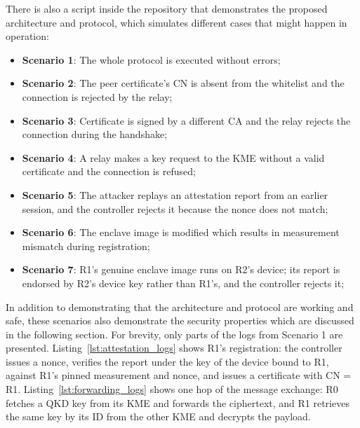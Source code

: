 \documentclass[futureinternet,article,submit,moreauthors]{Definitions/mdpi}
\begin{document}
There is also a script inside the repository that demonstrates the proposed architecture and protocol, which simulates different cases that might happen in operation:

\begin{itemize}[leftmargin=*,labelsep=5.8mm]
\item \textbf{Scenario 1}: The whole protocol is executed without errors;
\item \textbf{Scenario 2}: The peer certificate's CN is absent from the whitelist and the connection is rejected by the relay;
\item \textbf{Scenario 3}: Certificate is signed by a different CA and the relay rejects the connection during the handshake;
\item \textbf{Scenario 4}: A relay makes a key request to the KME without a valid certificate and the connection is refused;
\item \textbf{Scenario 5}: The attacker replays an attestation report from an earlier session, and the controller rejects it because the nonce does not match;
\item \textbf{Scenario 6}: The enclave image is modified which results in measurement mismatch during registration;
\item \textbf{Scenario 7}: R1's genuine enclave image runs on R2's device; its report is endorsed by R2's device key rather than R1's, and the controller rejects it;
\end{itemize}

In addition to demonstrating that the architecture and protocol are working and safe, these scenarios also demonstrate the security properties which are discussed in the following section. For brevity, only parts of the logs from Scenario 1 are presented. Listing~\ref{lst:attestation_logs} shows R1's registration: the controller issues a nonce, verifies the report under the key of the device bound to R1, against R1's pinned measurement and nonce, and issues a certificate with CN = R1. Listing~\ref{lst:forwarding_logs} shows one hop of the message exchange: R0 fetches a QKD key from its KME and forwards the ciphertext, and R1 retrieves the same key by its ID from the other KME and decrypts the payload.
\end{document}
